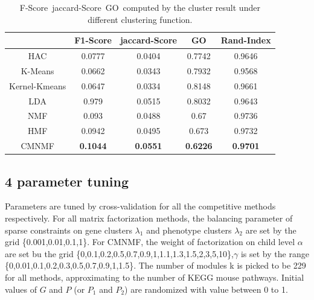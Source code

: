\documentclass{bmcart}
\begin{document}
\begin{table}
\centering
\caption{F-Score\ jaccard-Score\ GO\ computed by the cluster result under different clustering function.}
\label{tab:go}
\begin{tabular}{|c||c|c|c|c|}
\hline
&F1-Score &jaccard-Score& GO&Rand-Index\\
\hline
\hline
HAC&0.0777&0.0404&0.7742&0.9646\\
\hline
K-Means&0.0662  & 0.0343& 0.7932&0.9568\\
\hline
Kernel-Kmeans&0.0647&0.0334&0.8148&0.9661\\
\hline
LDA&0.979&0.0515&0.8032&0.9643\\
\hline
NMF&0.093&0.0488&0.67&0.9736\\
\hline
HMF&0.0942&0.0495&0.673&0.9732\\
\hline
CMNMF&\textbf{0.1044}& \textbf{0.0551}& \textbf{0.6226}&\textbf{0.9701}\\
\hline
\end{tabular}
\end{table}


\subsection*{4 parameter tuning}
Parameters are tuned by cross-validation for all the competitive methods respectively. For all matrix factorization methods, the balancing parameter of sparse constraints on gene clusters $\lambda_1$ and phenotype clusters $\lambda_2$ are set by the grid \{0.001,0.01,0.1,1\}. For CMNMF, the weight of factorization on child level $\alpha$ are set bu the grid \{0,0.1,0.2,0.5,0.7,0.9,1,1.1,1.3,1.5,2,3,5,10\},$\gamma$ is set by the range \{0,0.01,0.1,0.2,0.3,0.5,0.7,0.9,1,1.5\}. The number of modules k is picked to be 229 for all methods, approximating to the number of KEGG mouse pathways. Initial values of $G$ and $P$ (or $P_1$ and $P_2$) are randomized with value between 0 to 1.
\end{document}
